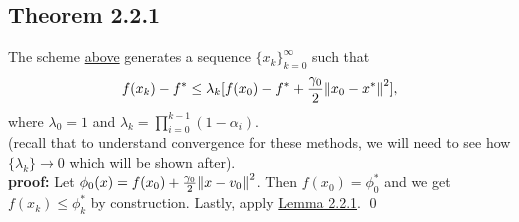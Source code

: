 \documentclass[12pt,a4paper]{article}
\begin{document}
	 \subsection*{Theorem 2.2.1}\label{thm221}
	 The scheme \hyperref[sec22opt]{above} generates a sequence $\{x_k\}_{k=0}^{\infty}$ such that
	 \begin{align*}
	 	f(x_k) - f^* \leq \lambda_k[f(x_0) - f^* + \frac{\gamma_0}{2}\norm{x_0 - x^*}^2],
	 \end{align*}
	 where $\lambda_0 = 1$ and $\lambda_k = \prod_{i=0}^{k-1}(1 - \alpha_i)$. \\(recall that to understand convergence for these methods, we will need to see how $\{\lambda_k\} \rightarrow 0$ which will be shown after).\\
	 \textbf{proof:} Let $\phi_0(x) = f(x_0) + \frac{\gamma_0}{2}\norm{x - v_0}^2$. Then $f(x_0) = \phi_0^*$ and we get $f(x_k) \leq \phi_k^*$ by construction. Lastly, apply \hyperref[lem221]{Lemma 2.2.1}. \qed
\end{document}
